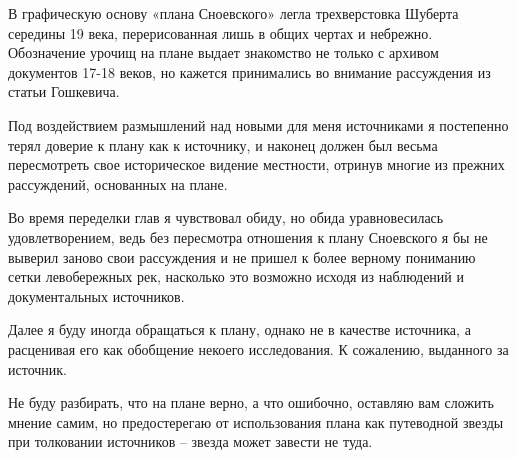 В графическую основу «плана Сноевского» легла трехверстовка Шуберта середины 19 века, перерисованная лишь в общих чертах и небрежно. Обозначение урочищ на плане выдает знакомство не только с архивом документов 17-18 веков, но кажется принимались во внимание рассуждения из статьи Гошкевича.

Под воздействием размышлений над новыми для меня источниками я постепенно терял доверие к плану как к источнику, и наконец должен был весьма пересмотреть свое историческое видение местности, отринув многие из прежних рассуждений, основанных на плане.

Во время переделки глав я чувствовал обиду, но обида уравновесилась удовлетворением, ведь без пересмотра отношения к плану Сноевского я бы не выверил заново свои рассуждения и не пришел к более верному пониманию сетки левобережных рек, насколько это возможно исходя из наблюдений и документальных источников.

Далее я буду иногда обращаться к плану, однако не в качестве источника, а расценивая его как обобщение некоего исследования. К сожалению, выданного за источник.

Не буду разбирать, что на плане верно, а что ошибочно, оставляю вам сложить мнение самим, но предостерегаю от использования плана как путеводной звезды при толковании источников – звезда может завести не туда.

